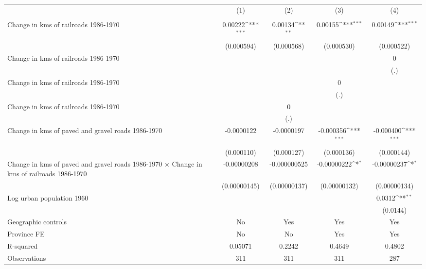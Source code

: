 {
\def\sym#1{\ifmmode^{#1}\else\(^{#1}\)\fi}
\begin{tabular}{l*{4}{c}}
\hline\hline
                &\multicolumn{1}{c}{(1)}&\multicolumn{1}{c}{(2)}&\multicolumn{1}{c}{(3)}&\multicolumn{1}{c}{(4)}\\
                &\multicolumn{1}{c}{}&\multicolumn{1}{c}{}&\multicolumn{1}{c}{}&\multicolumn{1}{c}{}\\
\hline
Change in kms of railroads 1986-1970&  0.00222\sym{***}&  0.00134\sym{**} &  0.00155\sym{***}&  0.00149\sym{***}\\
                &(0.000594)         &(0.000568)         &(0.000530)         &(0.000522)         \\
[1em]
Change in kms of railroads 1986-1970&                  &                  &                  &        0         \\
                &                  &                  &                  &      (.)         \\
[1em]
Change in kms of railroads 1986-1970&                  &                  &        0         &                  \\
                &                  &                  &      (.)         &                  \\
[1em]
Change in kms of railroads 1986-1970&                  &        0         &                  &                  \\
                &                  &      (.)         &                  &                  \\
[1em]
Change in kms of paved and gravel roads 1986-1970&-0.0000122         &-0.0000197         &-0.000356\sym{***}&-0.000400\sym{***}\\
                &(0.000110)         &(0.000127)         &(0.000136)         &(0.000144)         \\
[1em]
Change in kms of paved and gravel roads 1986-1970 $\times$ Change in kms of railroads 1986-1970&-0.00000208         &-0.000000525         &-0.00000222\sym{*}  &-0.00000237\sym{*}  \\
                &(0.00000145)         &(0.00000137)         &(0.00000132)         &(0.00000134)         \\
[1em]
Log urban population 1960&                  &                  &                  &   0.0312\sym{**} \\
                &                  &                  &                  & (0.0144)         \\
\hline
Geographic controls&       No         &      Yes         &      Yes         &      Yes         \\
Province FE     &       No         &       No         &      Yes         &      Yes         \\
R-squared       &  0.05071         &   0.2242         &   0.4649         &   0.4802         \\
Observations    &      311         &      311         &      311         &      287         \\
\hline\hline
\end{tabular}
}
